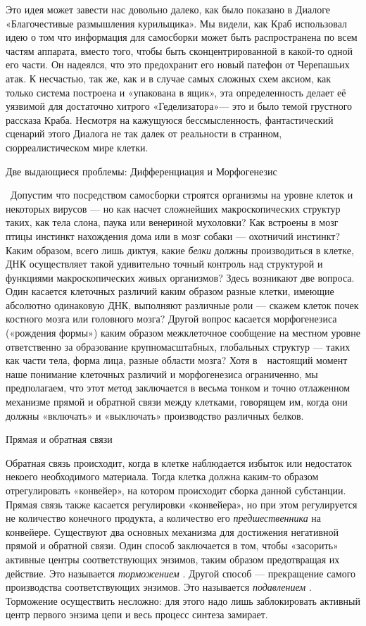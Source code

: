 \documentclass[../main.tex]{subfiles}
\begin{document}
Это идея может завести нас довольно далеко, как было показано в Диалоге «Благочестивые размышления курильщика». Мы видели, как Краб использовал идею о том что информация для самосборки может быть распространена по всем частям аппарата, вместо того, чтобы быть сконцентрированной в какой-то одной его части. Он надеялся, что это предохранит его новый патефон от Черепашьих атак. К несчастью, так же, как и в случае самых сложных схем аксиом, как только система построена и «упакована в ящик», эта определенность делает её уязвимой для достаточно хитрого «Геделизатора»--- это и было темой грустного рассказа Краба. Несмотря на кажущуюся бессмысленность, фантастический сценарий этого Диалога не так далек от реальности в странном, сюрреалистическом мире клетки.

Две выдающиеся проблемы: Дифференциация и Морфогенезис

~Допустим что посредством самосборки строятся организмы на уровне клеток и некоторых вирусов --- но как насчет сложнейших макроскопических структур таких, как тела слона, паука или венериной мухоловки? Как встроены в мозг птицы инстинкт нахождения дома или в мозг собаки --- охотничий инстинкт? Каким образом, всего лишь диктуя, какие \emph{белки} должны производиться в клетке, ДНК осуществляет такой удивительно точный контроль над структурой и функциями макроскопических живых организмов? Здесь возникают две вопроса. Один касается клеточных различий каким образом разные клетки, имеющие абсолютно одинаковую ДНК, выполняют различные роли --- скажем клеток почек костного мозга или головного мозга? Другой вопрос касается морфогенезиса («рождения формы») каким образом межклеточное сообщение на местном уровне ответственно за образование крупномасштабных, глобальных структур --- таких как части тела, форма лица, разные области мозга? Хотя в~~настоящий момент наше понимание клеточных различий и морфогенезиса ограниченно, мы предполагаем, что этот метод заключается в весьма тонком и точно отлаженном механизме прямой и обратной связи между клетками, говорящем им, когда они должны «включать» и «выключать» производство различных белков.

Прямая и обратная связи

Обратная связь происходит, когда в клетке наблюдается избыток или недостаток некоего необходимого материала. Тогда клетка должна каким-то образом отрегулировать «конвейер», на котором происходит сборка данной субстанции. Прямая связь также касается регулировки «конвейера», но при этом регулируется не количество конечного продукта, а количество его \emph{предшественника} на конвейере. Существуют два основных механизма для достижения негативной прямой и обратной связи. Один способ заключается в том, чтобы «засорить» активные центры соответствующих энзимов, таким образом предотвращая их действие. Это называется \emph{торможением} . Другой способ --- прекращение самого производства соответствующих энзимов. Это называется \emph{подавлением} . Торможение осуществить несложно: для этого надо лишь заблокировать активный центр первого энзима цепи и весь процесс синтеза замирает.
\end{document}
